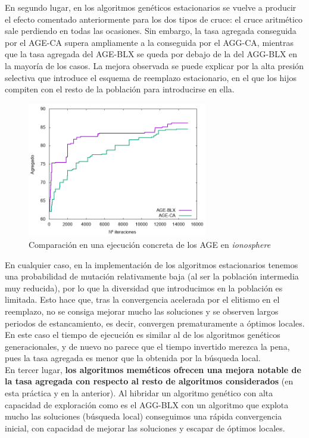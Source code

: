\documentclass[12pt]{article}
\begin{document}
En segundo lugar, en los algoritmos genéticos estacionarios se vuelve a producir el efecto comentado anteriormente para los dos tipos de cruce: el cruce aritmético sale perdiendo en todas las ocasiones. Sin embargo, la tasa agregada conseguida por el AGE-CA supera ampliamente a la conseguida por el AGG-CA, mientras que la tasa agregada del AGE-BLX se queda por debajo de la del AGG-BLX en la mayoría de los casos. La mejora observada se puede explicar por la alta presión selectiva que introduce el esquema de reemplazo estacionario, en el que los hijos compiten con el resto de la población para introducirse en ella.\\

\begin{figure}[ht!]
    \centering
    \includegraphics[width=0.7\textwidth]{img/AGE.png}
	\caption{Comparación en una ejecución concreta de los AGE en \textit{ionosphere}}
\end{figure}

En cualquier caso, en la implementación de los algoritmos estacionarios tenemos una probabilidad de mutación relativamente baja (al ser la población intermedia muy reducida), por lo que la diversidad que introducimos en la población es limitada. Esto hace que, tras la convergencia acelerada por el elitismo en el reemplazo, no se consiga mejorar mucho las soluciones y se observen largos periodos de estancamiento, es decir, convergen prematuramente a óptimos locales.\\

En este caso el tiempo de ejecución es similar al de los algoritmos genéticos generacionales, y de nuevo no parece que el tiempo invertido merezca la pena, pues la tasa agregada es menor que la obtenida por la búsqueda local. \\

En tercer lugar, \textbf{los algoritmos meméticos ofrecen una mejora notable de la tasa agregada con respecto al resto de algoritmos considerados} (en esta práctica y en la anterior). Al hibridar un algoritmo genético con alta capacidad de exploración como es el AGG-BLX con un algoritmo que explota mucho las soluciones (búsqueda local) conseguimos una rápida convergencia inicial, con capacidad de mejorar las soluciones y escapar de óptimos locales.\\
\end{document}
